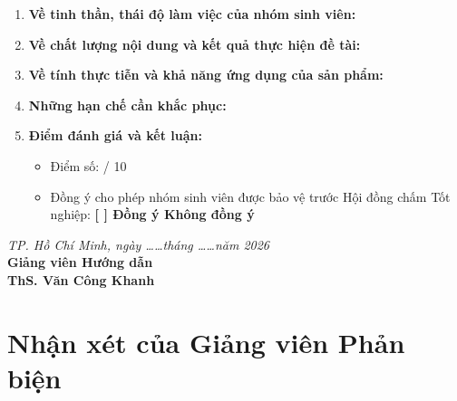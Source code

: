 \documentclass[12pt, a4paper]{report}
\begin{document}
\begin{enumerate}[label=\textbf{\arabic*.}, leftmargin=*]
    \item \textbf{Về tinh thần, thái độ làm việc của nhóm sinh viên:}
    \vspace{0.8cm}
    \dotfill
    \vspace{0.8cm}
    \dotfill
    
    \item \textbf{Về chất lượng nội dung và kết quả thực hiện đề tài:}
    \vspace{0.8cm}
    \dotfill
    \vspace{0.8cm}
    \dotfill
    
    \item \textbf{Về tính thực tiễn và khả năng ứng dụng của sản phẩm:}
    \vspace{0.8cm}
    \dotfill
    \vspace{0.8cm}
    \dotfill
    
    \item \textbf{Những hạn chế cần khắc phục:}
    \vspace{0.8cm}
    \dotfill
    
    \item \textbf{Điểm đánh giá và kết luận:}
    \begin{itemize}[noitemsep]
        \item Điểm số: \dotfill / 10
        \item Đồng ý cho phép nhóm sinh viên được bảo vệ trước Hội đồng chấm Tốt nghiệp: \textbf{[  ] Đồng ý \quad [  ] Không đồng ý}
    \end{itemize}
\end{enumerate}

\vspace{1cm}
\begin{flushright}
    \textit{TP. Hồ Chí Minh, ngày \dots\dots tháng \dots\dots năm 2026} \\[5pt]
    \textbf{Giảng viên Hướng dẫn} \\[40pt]
    \textbf{ThS. Văn Công Khanh}
\end{flushright}


\chapter*{Nhận xét của Giảng viên Phản biện}
\label{chap:nhanxet_gvpb}
\end{document}
